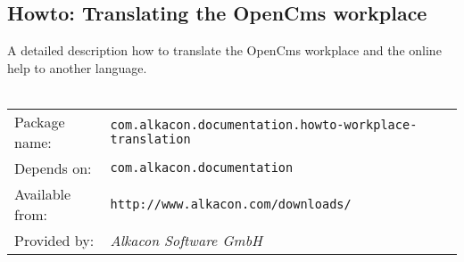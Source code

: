\subsection{Howto: Translating the OpenCms workplace}
A detailed description how to translate the OpenCms workplace and the online help to another language.
\\
\\
\begin{tabular}{ll}
Package name: & {\tt com.alkacon.documentation.howto-workplace-translation}\\
Depends on: & {\tt com.alkacon.documentation}\\
Available from: & {\tt http://www.alkacon.com/downloads/}\\
Provided by: & {\em Alkacon Software GmbH}\\
\end{tabular}